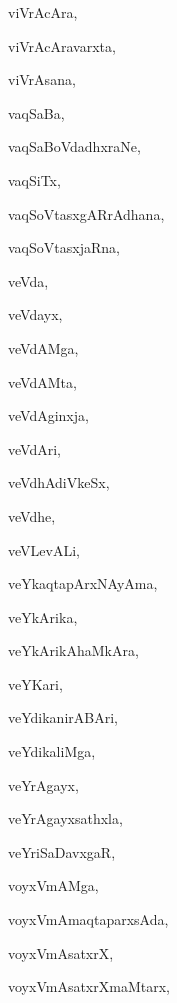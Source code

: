 \begin{multicols}{3}
{\noindent
{viVrAcAra}, \pageref{viVrAcAra}

\noindent
{viVrAcAravarxta}, \pageref{viVrAcAravarxta}

\noindent
{viVrAsana}, \pageref{viVrAsana}

\noindent
{vaqSaBa}, \pageref{vaqSaBa}

\noindent
{vaqSaBoVdadhxraNe}, \pageref{vaqSaBoVdadhxraNe}

\noindent
{vaqSiTx}, \pageref{vaqSiTx}

\noindent
{vaqSoVtasxgARrAdhana}, \pageref{vaqSoVtasxgARrAdhana}

\noindent
{vaqSoVtasxjaRna}, \pageref{vaqSoVtasxjaRna}

\noindent
{veVda}, \pageref{veVda}

\noindent
{veVdayx}, \pageref{veVdayx}

\noindent
{veVdAMga}, \pageref{veVdAMga}

\noindent
{veVdAMta}, \pageref{veVdAMta}

\noindent
{veVdAginxja}, \pageref{veVdAginxja}

\noindent
{veVdAri}, \pageref{veVdAri}

\noindent
{veVdhAdiVkeSx}, \pageref{veVdhAdiVkeSx}

\noindent
{veVdhe}, \pageref{veVdhe}

\noindent
{veVLevALi}, \pageref{veVLevALi}

\noindent
{veYkaqtapArxNAyAma}, \pageref{veYkaqtapArxNAyAma}

\noindent
{veYkArika}, \pageref{veYkArika}

\noindent
{veYkArikAhaMkAra}, \pageref{veYkArikAhaMkAra}

\noindent
{veYKari}, \pageref{veYKari}

\noindent
{veYdikanirABAri}, \pageref{veYdikanirABAri}

\noindent
{veYdikaliMga}, \pageref{veYdikaliMga}

\noindent
{veYrAgayx}, \pageref{veYrAgayx}

\noindent
{veYrAgayxsathxla}, \pageref{veYrAgayxsathxla}

\noindent
{veYriSaDavxgaR}, \pageref{veYriSaDavxgaR}

\noindent
{voyxVmAMga}, \pageref{voyxVmAMga}

\noindent
{voyxVmAmaqtaparxsAda}, \pageref{voyxVmAmaqtaparxsAda}

\noindent
{voyxVmAsatxrX}, \pageref{voyxVmAsatxrX}

\noindent
{voyxVmAsatxrXmaMtarx}, \pageref{voyxVmAsatxrXmaMtarx}

}
\end{multicols}
